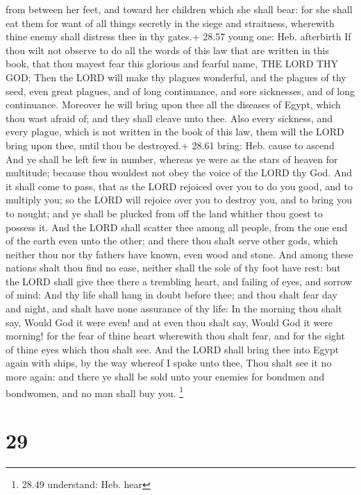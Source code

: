 from between her feet, and toward her children which she shall bear: for
she shall eat them for want of all things secretly in the siege and
straitness, wherewith thine enemy shall distress thee in thy gates.+
28.57 young one: Heb. afterbirth  If thou wilt not observe
to do all the words of this law that are written in this book, that thou
mayest fear this glorious and fearful name, THE LORD THY GOD;
 Then the LORD will make thy plagues wonderful, and the
plagues of thy seed, even great plagues, and of long continuance, and
sore sicknesses, and of long continuance.  Moreover he will
bring upon thee all the diseases of Egypt, which thou wast afraid of;
and they shall cleave unto thee.  Also every sickness, and
every plague, which is not written in the book of this law, them will
the LORD bring upon thee, until thou be destroyed.+ 28.61 bring: Heb.
cause to ascend  And ye shall be left few in number,
whereas ye were as the stars of heaven for multitude; because thou
wouldest not obey the voice of the LORD thy God.  And it
shall come to pass, that as the LORD rejoiced over you to do you good,
and to multiply you; so the LORD will rejoice over you to destroy you,
and to bring you to nought; and ye shall be plucked from off the land
whither thou goest to possess it.  And the LORD shall
scatter thee among all people, from the one end of the earth even unto
the other; and there thou shalt serve other gods, which neither thou nor
thy fathers have known, even wood and stone.  And among
these nations shalt thou find no ease, neither shall the sole of thy
foot have rest: but the LORD shall give thee there a trembling heart,
and failing of eyes, and sorrow of mind:  And thy life
shall hang in doubt before thee; and thou shalt fear day and night, and
shalt have none assurance of thy life:  In the morning thou
shalt say, Would God it were even! and at even thou shalt say, Would God
it were morning! for the fear of thine heart wherewith thou shalt fear,
and for the sight of thine eyes which thou shalt see.  And
the LORD shall bring thee into Egypt again with ships, by the way
whereof I spake unto thee, Thou shalt see it no more again: and there ye
shall be sold unto your enemies for bondmen and bondwomen, and no man
shall buy you. \footnote{28.49 understand: Heb. hear}

\hypertarget{section-28}{%
\section{29}\label{section-28}}

